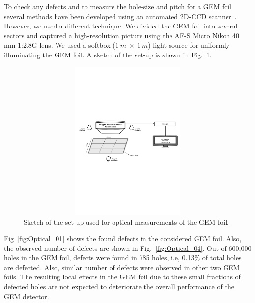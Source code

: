 To check any defects and to measure the hole-size and pitch for a GEM foil several methods have been developed using an automated 2D-CCD scanner~\cite{Posik2015, Becker2006}. 
However, we used a different technique.
We divided the GEM foil into several sectors and captured a high-resolution picture using the AF-S Micro Nikon 40 mm 1:2.8G lens.
We used a softbox ($1~m~\times~1~m$) light source for uniformly illuminating the GEM foil.
A sketch of the set-up is shown in Fig.~\ref{fig:Optical_Sketch}.
\begin{figure}[!htbp]
    \centering
        \includegraphics[width=12cm, height=8cm]{figures/GEM/figures/2.pdf}
   \caption{Sketch of the set-up used for optical measurements of the GEM foil.}   \label{fig:Optical_Sketch}
\end{figure}
Fig~\ref{fig:Optical_01} shows the found defects in the considered GEM foil.
Also, the observed number of defects are shown in Fig.~\ref{fig:Optical_04}.
Out of 600,000 holes in the GEM foil, defects were found in 785 holes, i.e, 0.13\% of total holes are defected.
Also, similar number of defects were observed in other two GEM foils.
The resulting local effects in the GEM foil due to these small fractions of defected holes are not expected to deteriorate the overall performance of the GEM detector.
